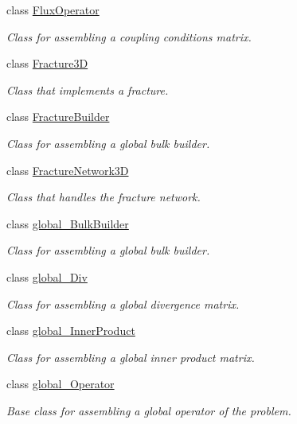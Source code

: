 \begin{DoxyCompactItemize}
class \hyperlink{classFVCode3D_1_1FluxOperator}{Flux\+Operator}
\begin{DoxyCompactList}\small\item\em Class for assembling a coupling conditions matrix. \end{DoxyCompactList}\item 
class \hyperlink{classFVCode3D_1_1Fracture3D}{Fracture3D}
\begin{DoxyCompactList}\small\item\em Class that implements a fracture. \end{DoxyCompactList}\item 
class \hyperlink{classFVCode3D_1_1FractureBuilder}{Fracture\+Builder}
\begin{DoxyCompactList}\small\item\em Class for assembling a global bulk builder. \end{DoxyCompactList}\item 
class \hyperlink{classFVCode3D_1_1FractureNetwork3D}{Fracture\+Network3D}
\begin{DoxyCompactList}\small\item\em Class that handles the fracture network. \end{DoxyCompactList}\item 
class \hyperlink{classFVCode3D_1_1global__BulkBuilder}{global\+\_\+\+Bulk\+Builder}
\begin{DoxyCompactList}\small\item\em Class for assembling a global bulk builder. \end{DoxyCompactList}\item 
class \hyperlink{classFVCode3D_1_1global__Div}{global\+\_\+\+Div}
\begin{DoxyCompactList}\small\item\em Class for assembling a global divergence matrix. \end{DoxyCompactList}\item 
class \hyperlink{classFVCode3D_1_1global__InnerProduct}{global\+\_\+\+Inner\+Product}
\begin{DoxyCompactList}\small\item\em Class for assembling a global inner product matrix. \end{DoxyCompactList}\item 
class \hyperlink{classFVCode3D_1_1global__Operator}{global\+\_\+\+Operator}
\begin{DoxyCompactList}\small\item\em Base class for assembling a global operator of the problem. \end{DoxyCompactList}\item 

\end{DoxyCompactItemize}
